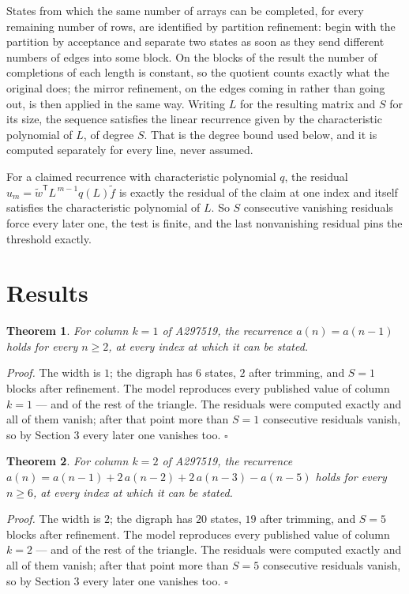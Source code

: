 \documentclass[11pt]{article}
\newtheorem{theorem}{Theorem}
\theoremstyle{definition}
\begin{document}
States from which the same number of arrays can be completed, for every remaining number of rows, are identified by partition refinement: begin with the partition by acceptance and separate two states as soon as they send different numbers of edges into some block. On the blocks of the result the number of completions of each length is constant, so the quotient counts exactly what the original does; the mirror refinement, on the edges coming in rather than going out, is then applied in the same way. Writing $L$ for the resulting matrix and $S$ for its size, the sequence satisfies the linear recurrence given by the characteristic polynomial of $L$, of degree $S$. That is the degree bound used below, and it is computed separately for every line, never assumed.

For a claimed recurrence with characteristic polynomial $q$, the residual $u_m = \tilde w^{\mathsf T}L^{\,m-1}q(L)\tilde f$ is exactly the residual of the claim at one index and itself satisfies the characteristic polynomial of $L$. So $S$ consecutive vanishing residuals force every later one, the test is finite, and the last nonvanishing residual pins the threshold exactly.

\section{Results}

\begin{theorem} For column $k = 1$ of A297519, the recurrence $a(n) = a(n-1)$ holds for every $n \ge 2$, at every index at which it can be stated.\end{theorem}

{\itshape Proof.} The width is $1$; the digraph has $6$ states, $2$ after trimming, and $S = 1$ blocks after refinement. The model reproduces every published value of column $k = 1$ --- and of the rest of the triangle. The residuals were computed exactly and all of them vanish; after that point more than $S = 1$ consecutive residuals vanish, so by Section 3 every later one vanishes too. $\square$

\begin{theorem} For column $k = 2$ of A297519, the recurrence $a(n) = a(n-1) + 2\,a(n-2) + 2\,a(n-3) - a(n-5)$ holds for every $n \ge 6$, at every index at which it can be stated.\end{theorem}

{\itshape Proof.} The width is $2$; the digraph has $20$ states, $19$ after trimming, and $S = 5$ blocks after refinement. The model reproduces every published value of column $k = 2$ --- and of the rest of the triangle. The residuals were computed exactly and all of them vanish; after that point more than $S = 5$ consecutive residuals vanish, so by Section 3 every later one vanishes too. $\square$
\end{document}
